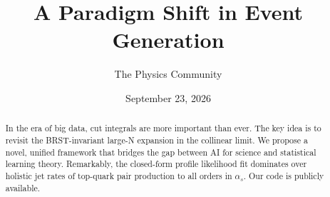 \documentclass[11pt]{article}
\title{A Paradigm Shift in Event Generation}
\author{The Physics Community}
\date{September 23, 2026}
\begin{document}
\maketitle
\begin{abstract}
In the era of big data, cut integrals are more important than ever. The
key idea is to revisit the BRST-invariant large-N expansion in the
collinear limit. We propose a novel, unified framework that bridges the
gap between AI for science and statistical learning theory. Remarkably,
the closed-form profile likelihood fit dominates over holistic jet rates
of top-quark pair production to all orders in $\alpha_s$. Our code is
publicly available.
\end{abstract}
\tableofcontents





\nocite{*}


\end{document}
